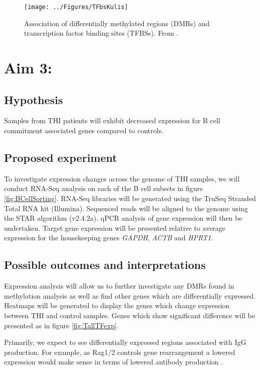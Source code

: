 \documentclass[12pt]{article}
\begin{document}
			\begin{figure}[tb]
				\centering
				\texttt{[image: ../Figures/TFbsKulis]}
				\caption{Association of differentially methylated regions (DMRs) and transcription factor binding sites (TFBSs). From \citet{Kulis15}.}
				\label{fig:TFBSheatmap}
			\end{figure}
		
	\section{Aim 3:}
	
		\subsection{Hypothesis}
			
			Samples from THI patients will exhibit decreased expression for B cell commitment associated genes compared to controls.
					
		\subsection{Proposed experiment}
			
			To investigate expression changes across the genome of THI samples, we will conduct RNA-Seq analysis on each of the B cell subsets in figure \ref{fig:BCellSorting}. 
			RNA-Seq libraries will be generated using the TruSeq Stranded Total RNA kit (Illumina). 
			Sequenced reads will be aligned to the genome using the STAR algorithm (v2.4.2a)\citep{Dobin13}.
			qPCR analysis of gene expression will then be undertaken. 
			Target gene expression will be presented relative to average expression for the housekeeping genes \textit{GAPDH}, \textit{ACTB} and \textit{HPRT1}.
			
		\subsection{Possible outcomes and interpretations}				
			
			Expression analysis will allow us to  further investigate any DMRs found in methylation analysis as well as find other genes which are differentially expressed. 
			Heatmaps will be generated to display the genes which change expression between THI and control samples. 
			Genes which show significant difference will be presented as in figure \ref{fig:TallTFexp}.
			
			Primarily, we expect to see differentially expressed regions associated with IgG production. 
			For example, as Rag1/2 controls gene rearrangement a lowered expression would make sense in terms of lowered antibody production \citep{Choukrallah14}.
			
\end{document}
